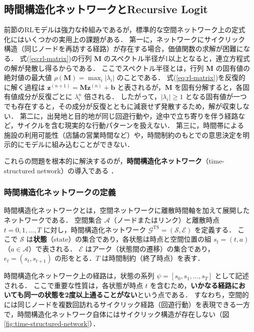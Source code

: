 \subsection{時間構造化ネットワークとRecursive Logit}\label{ssec:time_structured_rl}
前節のRLモデルは強力な枠組みであるが，標準的な空間ネットワーク上の定式化にはいくつかの実用上の課題がある．
第一に，ネットワークにサイクリック構造（同じノードを再訪する経路）が存在する場合，価値関数の求解が困難になる．
式(\ref{eq:rl-matrix})の行列 $\bm{M}$ のスペクトル半径が1以上となると，連立方程式の解が発散し得るからである．
ここでスペクトル半径とは，行列 $\bm{M}$ の固有値の絶対値の最大値 $\rho(\bm{M}) = \max_i |\lambda_i|$ のことである．
式(\ref{eq:rl-matrix})を反復的に解く過程は $\bm{z}^{(n+1)} = \bm{M}\bm{z}^{(n)} + \bm{b}$ と表されるが，$\bm{M}$ を固有分解すると，各固有値成分が反復ごとに $\lambda_i^n$ 倍される．
したがって，$|\lambda_i| \geq 1$ となる固有値が一つでも存在すると，その成分が反復とともに減衰せず発散するため，解が収束しない．
第二に，出発地と目的地が同じ回遊行動や，途中で立ち寄りを伴う経路など，サイクルを含む現実的な行動パターンを扱えない．
第三に，時間帯による施設の利用可能性（店舗の営業時間など）や，時間制約のもとでの意思決定を明示的にモデルに組み込むことができない．

これらの問題を根本的に解決するのが，\textbf{時間構造化ネットワーク}（time-structured network）の導入である \cite{OyamaHato2016, Oyama2019}．

\subsubsection{時間構造化ネットワークの定義}
時間構造化ネットワークとは，空間ネットワークに離散時間軸を加えて展開したネットワークである．
空間集合 $\mathcal{A}$（ノードまたはリンク）と離散時点 $t = 0, 1, \ldots, T$ に対し，時間構造化ネットワーク $\mathcal{G}^{\mathrm{TS}} = (\mathcal{S}, \mathcal{E})$ を定義する．
ここで $\mathcal{S}$ は\textbf{状態}（state）の集合であり，各状態は時点と空間位置の組 $s_t = (t, a)$（$a \in \mathcal{A}$）で表される．
$\mathcal{E}$ はアーク（状態間の遷移）の集合であり，$e_t = (s_t, s_{t+1})$ の形をとる．$T$ は時間制約（終了時点）を表す．

時間構造化ネットワーク上の経路は，状態の系列 $\psi = [s_0, s_1, \ldots, s_T]$ として記述される．
ここで重要な性質は，各状態が時点 $t$ を含むため，\textbf{いかなる経路においても同一の状態を2度以上通ることがない}という点である．
すなわち，空間的には同じノードを複数回訪れるサイクリック経路（回遊行動）を表現できる一方で，時間構造化ネットワーク自体にはサイクリック構造が存在しない（図\ref{fig:time-structured-network}）．

